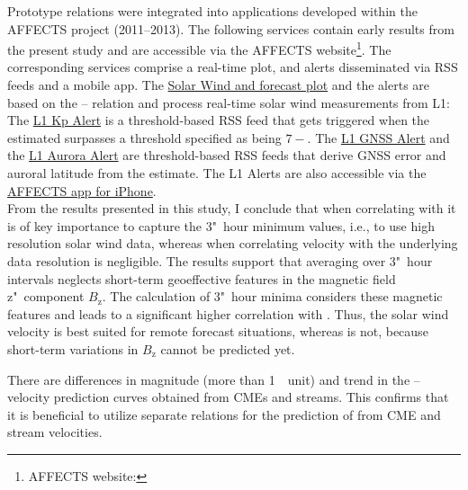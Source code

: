 Prototype \Kp{} relations were integrated into applications developed within the AFFECTS project (2011--2013). The following services contain early results from the present \Kp{} study and are accessible via the \mbox{AFFECTS} website\footnote{AFFECTS website: }. The corresponding services comprise a real-time plot, and alerts disseminated via RSS feeds and a mobile app. The \href{http://www.affects-fp7.eu/rssfeeds/ace_ap_forecast_plot/ace_realtime_ap_CH_GFT_plot.png}{Solar Wind and \Kp{} forecast plot} and the alerts are based on the \Kp--\vBz{} relation and process real-time solar wind measurements from L1: The \href{http://www.affects-fp7.eu/rssfeeds/rssfeed_kp/rssfeed_kp.xml}{L1 Kp Alert} is a threshold-based RSS feed that gets triggered when the estimated \Kp{} surpasses a threshold specified as being $7-$. The \href{http://www.affects-fp7.eu/rssfeeds/rssfeed_gnss/rssfeed_gnss.xml}{L1 GNSS Alert} and the \href{http://www.affects-fp7.eu/rssfeeds/rssfeed_aurora/rssfeed_aurora.xml}{L1 Aurora Alert} are threshold-based RSS feeds that derive GNSS error and auroral latitude from the \Kp{} estimate. The L1 Alerts are also accessible via the \href{https://itunes.apple.com/au/app/affects/id893579846}{AFFECTS app for iPhone}.\\


From the results presented in this study, I conclude that when correlating \vBz{} with \Kp{} it is of key importance to capture the 3"~hour minimum values, i.e., to use high resolution solar wind data, whereas when correlating velocity with \Kp{} the underlying data resolution is negligible. The results support that averaging over 3"~hour intervals neglects short-term geoeffective features in the magnetic field z"~component $B_\text{z}$. The calculation of 3"~hour minima considers these magnetic features and leads to a significant higher correlation with \Kp{}. Thus, the solar wind velocity is best suited for remote forecast situations, whereas \vBz{} is not, because short-term variations in $B_\text{z}$ cannot be predicted yet.

There are differences in magnitude (more than 1~\Kp~unit) and trend in the \Kp--velocity prediction curves obtained from CMEs and streams. This confirms that it is beneficial to utilize separate relations for the prediction of \Kp{} from CME and stream velocities.

